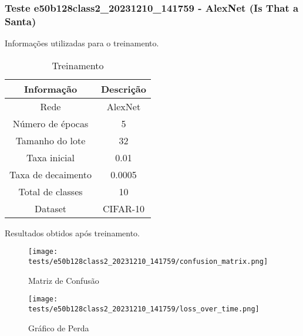 \subsubsection{Teste e50b128class2_20231210_141759 - AlexNet (Is That a Santa)}

Informações utilizadas para o treinamento.

\begin{table}[ht]
   \centering
   \caption{Treinamento}
   \label{tab:modelos}
   \begin{tabular}{| c | c | }
      \hline 
      \textbf{Informação} & \textbf{Descrição} \\
      \hline \hline 
      Rede & AlexNet \\
      \hline
      Número de épocas & 5\\
      \hline
      Tamanho do lote & 32\\
      \hline
      Taxa inicial & 0.01 \\
      \hline
      Taxa de decaimento & 0.0005 \\
      \hline
      Total de classes & 10\\
      \hline
      Dataset & CIFAR-10\\
      \hline
   \end{tabular} 
\end{table}

Resultados obtidos após treinamento.


\begin{figure}[ht]
 \begin{center}
   \texttt{[image: tests/e50b128class2\_20231210\_141759/confusion\_matrix.png]}
  \caption{Matriz de Confusão}
  \label{fig:fig03}
 \end{center}
\end{figure}

\begin{figure}[ht]
 \begin{center}
   \texttt{[image: tests/e50b128class2\_20231210\_141759/loss\_over\_time.png]}
  \caption{Gráfico de Perda}
  \label{fig:fig04}
 \end{center}
\end{figure}
